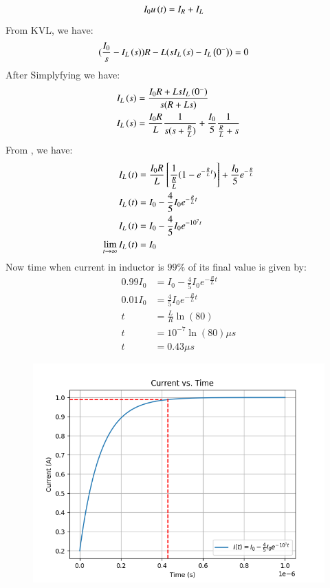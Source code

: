\documentclass[journal,12pt,twocolumn]{IEEEtran}
\theoremstyle{remark}
\begin{document}
\begin{align}
    I_0u\left(t\right) &= I_R + I_L
\end{align}
From KVL, we have:
\begin{align}
    (\frac{I_0}{s} -I_L\left(s\right))R - L(sI_L\left(s\right) - I_L\left(0^-\right)) &=0
\end{align}
After Simplyfying we have:
\begin{align}
    I_L\left(s\right) &= \frac{ I_0R +LsI_L\left(0^-\right)}{s(R+Ls)}\\
    I_L\left(s\right) &= \frac{I_0R}{L}\frac{1}{s(s+\frac{R}{L})} + \frac{I_0}{5}\frac{1}{\frac{R}{L}+s}
\end{align}
From , we have:
\begin{align}
    I_L\left(t\right) & = \frac{I_0R}{L} {}\left[\frac{1}{\frac{R}{L}}(1-e^{-\frac{R}{L}t})\right] + \frac{I_0}{5}e^{-\frac{R}{L}}\\
    I_L\left(t\right) &= I_0 -\frac{4}{5}I_0e^{-\frac{R}{L}t}\\
    I_L\left(t\right) &= I_0 -\frac{4}{5}I_0e^{-10^{7}t}\\
    \lim_{t \to \infty} I_L\left(t\right) &= I_0
\end{align}
Now time when current in inductor is $99\%$ of its final value is given by:
\begin{align}
    0.99I_0 &= I_0 -\frac{4}{5}I_0e^{-\frac{R}{L}t}\\
    0.01I_0 &= \frac{4}{5}I_0e^{-\frac{R}{L}t}\\
    t &= \frac{L}{R}\ln(80)\\
    t &= 10^{-7}\ln(80) \mu s\\
    t &= 0.43 \mu s
\end{align}
\begin{figure}[ht!]
	\includegraphics[width=\columnwidth]{2023/IN/47/plots/Figure_1.png}
\end{figure}

  
\end{document}
